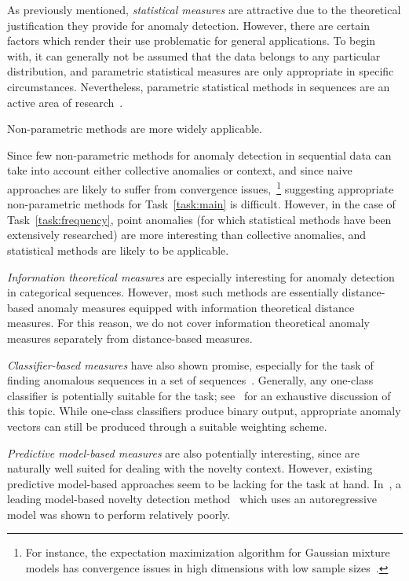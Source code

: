 As previously mentioned, \emph{statistical measures} are attractive due to the theoretical justification they provide for anomaly detection. However, there are certain factors which render their use problematic for general applications. To begin with, it can generally not be assumed that the data belongs to any particular distribution, and parametric statistical measures are only appropriate in specific circumstances. Nevertheless, parametric statistical methods in sequences are an active area of research~\cite{TODO}.

Non-parametric methods are more widely applicable.

Since few non-parametric methods for anomaly detection in sequential data can take into account either collective anomalies or context, and since naive approaches are likely to suffer from convergence issues,~\footnote{For instance, the expectation maximization algorithm for Gaussian mixture models has convergence issues in high dimensions with low sample sizes~\cite{TODO}.} suggesting appropriate non-parametric methods for Task~\ref{task:main} is difficult. However, in the case of Task~\ref{task:frequency}, point anomalies (for which statistical methods have been extensively researched) are more interesting than collective anomalies, and statistical methods are likely to be applicable.

\emph{Information theoretical measures} are especially interesting for anomaly detection in categorical sequences. However, most such methods are essentially distance-based anomaly measures equipped with information theoretical distance measures. For this reason, we do not cover information theoretical anomaly measures separately from distance-based measures.

\emph{Classifier-based measures} have also shown promise, especially for the task of finding anomalous sequences in a set of sequences~\cite{chandola3}. Generally, any one-class classifier is potentially suitable for the task; see~\cite{classification} for an exhaustive discussion of this topic. While one-class classifiers produce binary output, appropriate anomaly vectors can still be produced through a suitable weighting scheme.

\emph{Predictive model-based measures} are also potentially interesting, since are naturally well suited for dealing with the novelty context. However, existing predictive model-based approaches seem to be lacking for the task at hand. In~\cite{chandola3}, a leading model-based novelty detection method~\cite{perkins2} which uses an autoregressive model was shown to perform relatively poorly.

